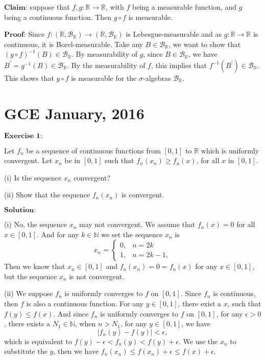 \documentclass[12pt]{article}
\begin{document}
$\textbf{Claim:}$ suppose that $f, g: \mathbb{R} \rightarrow \mathbb{R}$, with $f$ being a measurable function, and $g$ being a continuous function. Then $g \circ f$ is measurable.

$\textbf{Proof:}$ Since $f: (\mathbb{R}, \mathcal{B}_{\mathbb{R}}) \rightarrow (\mathbb{R}, \mathcal{B}_{\mathbb{R}})$ is Lebesgue-measurable and as $g: \mathbb{R} \rightarrow \mathbb{R}$ is continuous, it is Borel-measurable. Take any $B \in \mathcal{B}_{\mathbb{R}}$, we want to show that $(g \circ f)^{-1}(B) \in \mathcal{B}_{\mathbb{R}}$. By measurability of $g$, since $B \in \mathcal{B}_{\mathbb{R}}$, we have $B^{'} = g^{-1}(B) \in \mathcal{B}_{\mathbb{R}}$. By the measurability of $f$, this implies that $f^{-1}(B^{'}) \in \mathcal{B}_{\mathbb{R}}$. This shows that $g \circ f$ is measurable for the $\sigma$-algebras $\mathcal{B}_{\mathbb{R}}$.

\newpage

\section{GCE January, 2016}

$\textbf{Exercise 1:}$

Let $f_{n}$ be a sequence of continuous functions from $[0, 1]$ to $\mathbb{R}$ which is uniformly convergent. Let $x_{n}$ be in $[0, 1]$ such that $f_{n}(x_{n}) \geq f_{n}(x)$, for all $x$ in $[0, 1]$.

(i) Is the sequence $x_{n}$ convergent?

(ii) Show that the sequence $f_{n}(x_{n})$ is convergent.

\vspace{8pt}

$\textbf{Solution:}$

(i) No, the sequence $x_{n}$ may not convergent. We assume that $f_{n} (x) = 0$ for all $x \in [0, 1]$. And for any $k \in \mathbb{N}$ we set the sequence $x_{n}$ is
\begin{equation*}
x_{n} =
\left\{
             \begin{array}{cl}
             0, & n = 2k \\
             1, & n = 2k -1,
             \end{array}
\right.
\end{equation*}
Then we know that $x_{n} \in [0, 1]$ and $f_{n}(x_{n}) = 0 = f_{n}(x)$ for any $x \in [0, 1]$, but the sequence $x_{n}$ is not convergent.

(ii) We suppose $f_{n}$ is uniformly converges to $f$ on $[0, 1]$. Since $f_{n}$ is continuous, then $f$ is also a continuous function. For any $y \in [0, 1]$, there exist a $x$, such that $f(y) \leq f(x)$. And since $f_{n}$ is uniformly converges to $f$ on $[0, 1]$, for any $\epsilon > 0$, there exists a $N_{1} \in \mathbb{N}$, when $n > N_{1}$, for any $y \in [0, 1]$, we have
\begin{equation*}
    |f_{n}(y) - f(y)| < \epsilon,
\end{equation*}
which is equivalent to $f(y) - \epsilon < f_{n}(y) < f(y) + \epsilon$. We use the $x_{n}$ to substitute the $y$, then we have $f_{n}(x_{n}) \leq f(x_{n}) + \epsilon \leq f(x) + \epsilon$. 
\end{document}
